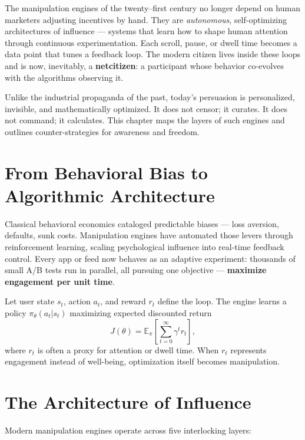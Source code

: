 \documentclass[12pt,twoside]{book}
\begin{document}
The manipulation engines of the twenty–first century no longer depend on human marketers adjusting incentives by hand.  
They are \emph{autonomous}, self-optimizing architectures of influence — systems that learn how to shape human attention through continuous experimentation.  
Each scroll, pause, or dwell time becomes a data point that tunes a feedback loop.  
The modern citizen lives inside these loops and is now, inevitably, a \textbf{netcitizen}: a participant whose behavior co-evolves with the algorithms observing it.

Unlike the industrial propaganda of the past, today’s persuasion is personalized, invisible, and mathematically optimized.  
It does not censor; it curates.  
It does not command; it calculates.  
This chapter maps the layers of such engines and outlines counter-strategies for awareness and freedom.

\section{From Behavioral Bias to Algorithmic Architecture}

Classical behavioral economics cataloged predictable biases — loss aversion, defaults, sunk costs.  
Manipulation engines have automated those levers through reinforcement learning, scaling psychological influence into real-time feedback control.  
Every app or feed now behaves as an adaptive experiment: thousands of small A/B tests run in parallel, all pursuing one objective — \textbf{maximize engagement per unit time}.

\begin{tcolorbox}[colback=gray!5,colframe=gray!60,boxrule=0.4pt,arc=1mm,
title=Mathematical Interlude: Reinforcement Objective]
Let user state $s_t$, action $a_t$, and reward $r_t$ define the loop.  
The engine learns a policy $\pi_\theta(a_t|s_t)$ maximizing expected discounted return
\[
J(\theta)=\mathbb{E}_\pi\!\left[\sum_{t=0}^{\infty}\gamma^t r_t\right],
\]
where $r_t$ is often a proxy for attention or dwell time.  
When $r_t$ represents engagement instead of well-being, optimization itself becomes manipulation.
\end{tcolorbox}

\section{The Architecture of Influence}

Modern manipulation engines operate across five interlocking layers:
\end{document}
